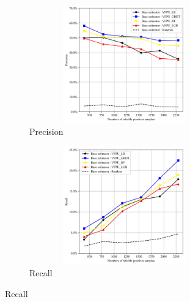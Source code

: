\documentclass[10pt,journal,compsoc]{IEEEtran}
\begin{document}
\begin{figure}[!htbp]
	\centering
	\captionsetup{size=footnotesize}
	\begin{subfigure}{0.45\textwidth}
		\centering
		\captionsetup{skip=4pt}
		\captionsetup{size=scriptsize}
		\includegraphics[width=0.9\textwidth,height=5.1cm]{./Figure 3 (1) in JEPG format}
		\caption{Precision}
		\label{RQ2.2.sub1}
	\end{subfigure}
	\begin{subfigure}{0.45\textwidth}
		\centering
		\captionsetup{skip=4pt}
		\captionsetup{size=scriptsize}
		\includegraphics[width=0.9\textwidth,height=5.1cm]{./Figure 3 (2) in JEPG format}
		\caption{Recall}
		\label{RQ2.2.sub2}
	\end{subfigure}
	
	

\end{figure}
\end{document}
